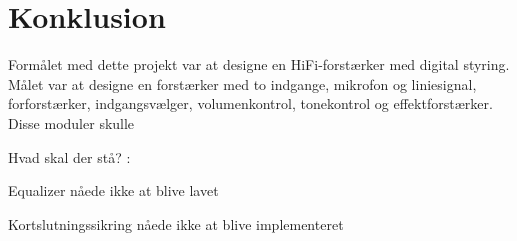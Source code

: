 \chapter{Konklusion}
\label{konklusion}

Formålet med dette projekt var at designe en HiFi-forstærker med digital styring. Målet var at designe en forstærker med to indgange, mikrofon og liniesignal, forforstærker, indgangsvælger, volumenkontrol, tonekontrol og effektforstærker. Disse moduler skulle 

Hvad skal der stå? :


Equalizer nåede ikke at blive lavet

Kortslutningssikring nåede ikke at blive implementeret

